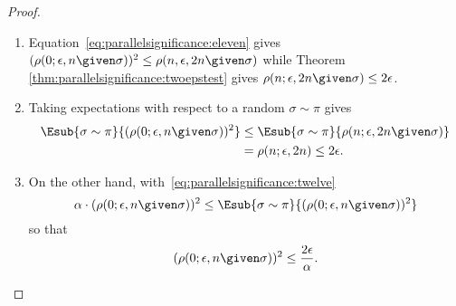 \documentclass[12pt]{article}
\begin{document}
\begin{proof}
\begin{enumerate}
        \item
            Equation~\eqref{eq:parallelsignificance:eleven} gives \( (\rho
            (0; \epsilon, n \given \sigma))^2 \le \rho(n, \epsilon, 2n
            \given \sigma) \) while Theorem~%
            \ref{thm:parallelsignificance:twoepstest} gives \( \rho(n;
            \epsilon, 2n \given \sigma) \le 2\epsilon \).
        \item
            Taking expectations with respect to a random \( \sigma \sim
            \pi \) gives
            \begin{align*}
                \Esub{\sigma \sim \pi}{(\rho(0; \epsilon, n \given
                \sigma))^2}     & \le \Esub{\sigma \sim \pi}{\rho(n;
                \epsilon, 2n \given \sigma) } \\
                &= \rho(n; \epsilon, 2n) \le 2\epsilon.
            \end{align*}
        \item
            On the other hand, with~\eqref{eq:parallelsignificance:twelve}
            \[
                \alpha \cdot (\rho(0; \epsilon, n \given \sigma))^2 \le
                \Esub{\sigma \sim \pi}{(\rho(0; \epsilon, n \given
                \sigma))^2 }
            \] so that
            \[
                (\rho(0; \epsilon, n \given \sigma))^2 \le \frac{2\epsilon}
                {\alpha}.
            \]
    \end{enumerate}
\end{proof}
\end{document}
